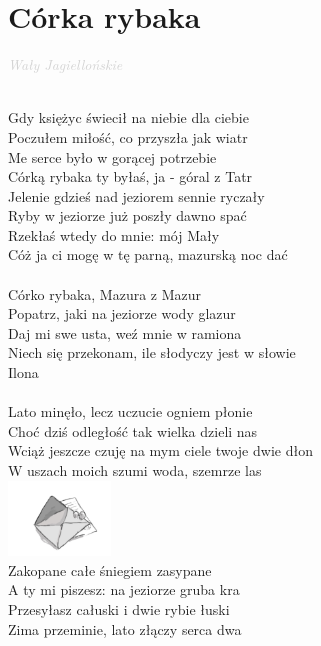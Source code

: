 \documentclass[a5paper, 10pt]{book}
\begin{document}
\section{Córka rybaka}\textcolor{lightgray}{\textit{Wały Jagiellońskie}}\\~\\
\begin{minipage}[t]{0.8\textwidth}
  Gdy księżyc świecił na niebie dla ciebie\\
  Poczułem miłość, co przyszła jak wiatr\\
  Me serce było w gorącej potrzebie\\
  Córką rybaka ty byłaś, ja - góral z Tatr\\
  Jelenie gdzieś nad jeziorem sennie ryczały\\
  Ryby w jeziorze już poszły dawno spać\\
  Rzekłaś wtedy do mnie: mój Mały\\
  Cóż ja ci mogę w tę parną, mazurską noc dać\\
  \\
  \hspace*{5mm}Córko rybaka, Mazura z Mazur\\
  \hspace*{5mm}Popatrz, jaki na jeziorze wody glazur\\
  \hspace*{5mm}Daj mi swe usta, weź mnie w ramiona\\
  \hspace*{5mm}Niech się przekonam, ile słodyczy jest w słowie\\
  \hspace*{5mm}Ilona\\
  \\
  Lato minęło, lecz uczucie ogniem płonie\\
  Choć dziś odległość tak wielka dzieli nas\\
  Wciąż jeszcze czuję na mym ciele twoje dwie dłon\\
  W uszach moich szumi woda, szemrze las\\
  \includegraphics[height=2cm,right]{images/corka_rybaka.png}\vspace*{-21mm}\\
  Zakopane całe śniegiem zasypane\\
  A ty mi piszesz: na jeziorze gruba kra\\
  Przesyłasz całuski i dwie rybie łuski\\
  Zima przeminie, lato złączy serca dwa\\
\end{minipage}
\end{document}
